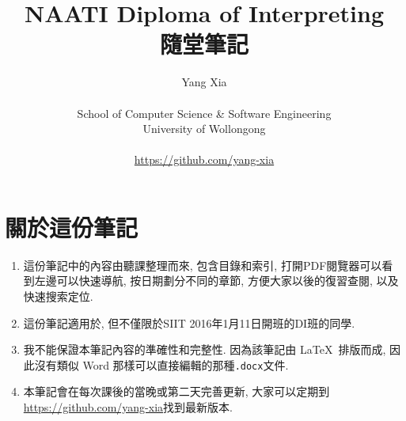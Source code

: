 \documentclass[12pt]{book}
\title{NAATI Diploma of Interpreting\\ 隨堂筆記}
\author{\LARGE{Yang Xia}\\ \\ School of Computer Science \& Software Engineering \\ University of Wollongong \\ \\ \url{https://github.com/yang-xia}}
\date{}
\begin{document}
\maketitle{}

\begingroup
\let\cleardoublepage\clearpage
\tableofcontents
\thispagestyle{empty}
\endgroup
\newpage

\section*{關於這份筆記}
\begin{tcolorbox}
\begin{enumerate}
	\item 這份筆記中的內容由聽課整理而來, 包含目錄和索引, 打開PDF閱覽器可以看到左邊可以快速導航, 按日期劃分不同的章節, 方便大家以後的復習查閱, 以及快速搜索定位.
	\item 這份筆記適用於, 但不僅限於SIIT 2016年1月11日開班的DI班的同學.
	\item 我不能保證本筆記內容的準確性和完整性. 因為該筆記由 \LaTeX\ 排版而成, 因此沒有類似 Word 那樣可以直接編輯的那種\texttt{.docx}文件.
	\item 本筆記會在每次課後的當晚或第二天完善更新, 大家可以定期到\url{https://github.com/yang-xia}找到最新版本.
\end{enumerate}
\end{tcolorbox}

\begin{tcolorbox}
\doclicenseThis
\end{tcolorbox}











\end{document}

